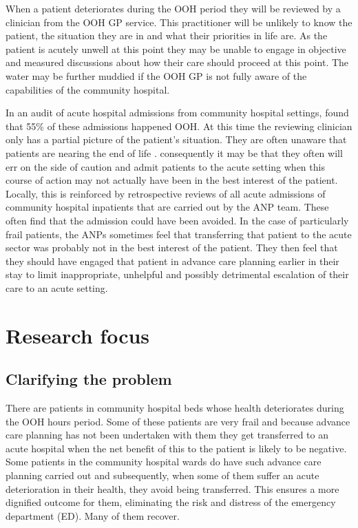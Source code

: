 \documentclass
[
	12pt,
	a4paper,
	oneside,
]{report}
\begin{document}
When a patient deteriorates during the OOH period they will be reviewed by a clinician
from the OOH GP service. This practitioner will be unlikely to know the patient,
the situation they are in and what their priorities in life are. As the patient is
acutely unwell at this point they may be unable to engage in objective and measured
discussions about how their care should proceed at this point. The water may be
further muddied if the OOH GP is not fully aware of the capabilities of the 
community hospital. 

In an audit of acute hospital admissions from community hospital settings,
\textcite{endacott:15} found that 55\% of these admissions happened OOH. 
At this time the reviewing clinician only has a partial picture of the 
patient's situation. They are often unaware that patients are nearing the end
of life \parencite{brettell:18}. consequently it may 
be that they often will err on the side of caution and
admit patients to the acute setting when this course of action may not actually have
been in the best interest of the patient. Locally, this is reinforced by 
retrospective reviews
of all acute admissions of community hospital inpatients that are carried out by the 
ANP team. These often find that the admission could have been avoided. In the case
of particularly frail patients, the ANPs sometimes feel that transferring that
patient to the acute sector was probably not in the best interest of the patient. 
They then feel that they should have engaged that patient in advance care planning
earlier in their stay to limit inappropriate, unhelpful and possibly detrimental 
escalation of their care to an acute setting.

\section{Research focus}

\subsection{Clarifying the problem}

There are patients in community hospital beds whose health deteriorates during
the OOH hours period. Some of these patients are very frail and because advance
care planning has not been undertaken with them they get transferred to an acute 
hospital when the net benefit of this to the patient is likely to be negative.
Some patients in the community hospital wards do have such advance care planning 
carried out and subsequently, when some of them suffer an acute deterioration in
their health, they avoid being transferred. This ensures a more
dignified outcome for them, eliminating the risk and distress of the emergency
department (ED). Many of them recover.
\end{document}
